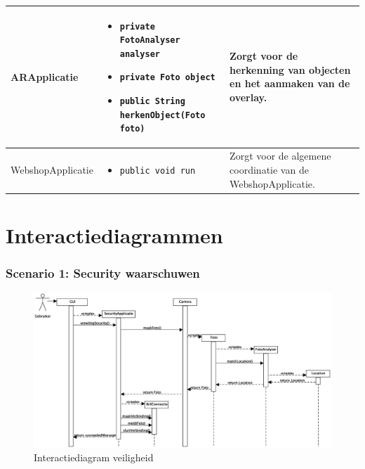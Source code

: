 \documentclass[12pt,a4paper,oneside]{article}
\begin{document}
\begin{longtable}{|l|p{6cm}|p{5cm}|}
\hline
ARApplicatie &\vspace*{-10mm}\begin{itemize}[parsep=-2pt,leftmargin=0.3cm] 
\item \texttt{private FotoAnalyser analyser}
\item \texttt{private Foto object}
\item \texttt{public String herkenObject(Foto foto)} \vspace*{-6mm} 
\end{itemize}& Zorgt voor de herkenning van objecten en het aanmaken van de overlay.\\
\hline
WebshopApplicatie &\vspace*{-10mm}\begin{itemize}[parsep=-2pt,leftmargin=0.3cm] 
\item \texttt{public void run} \vspace*{-6mm} 
\end{itemize}& Zorgt voor de algemene coordinatie van de WebshopApplicatie.\\
\hline
\end{longtable}
\section{Interactiediagrammen}
\subsubsection*{Scenario 1: Security waarschuwen}
\begin{figure}[H]
  \begin{center}
    \includegraphics[scale=0.35]{sequentie_security_final.eps}
    \caption{Interactiediagram veiligheid}
    \label{graph:graph1}
  \end{center}
\end{figure}
\end{document}

